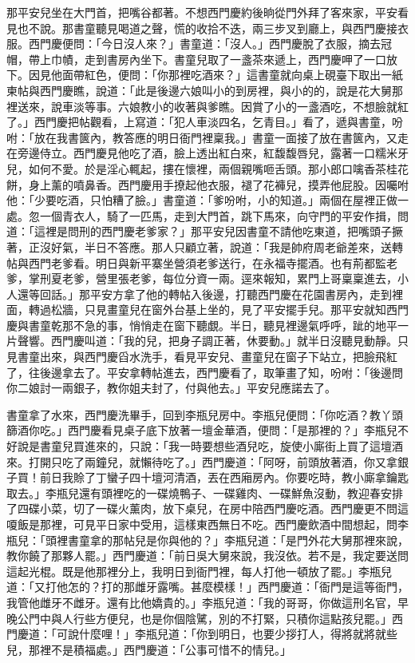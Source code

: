 那平安兒坐在大門首，把嘴谷都著。不想西門慶約後晌從門外拜了客來家，平安看見也不說。那書童聽見喝道之聲，慌的收拾不迭，兩三步叉到廳上，與西門慶接衣服。西門慶便問：「今日沒人來？」書童道：「沒人。」西門慶脫了衣服，摘去冠帽，帶上巾幘，走到書房內坐下。書童兒取了一盞茶來遞上，西門慶呷了一口放下。因見他面帶紅色，便問：「你那裡吃酒來？」這書童就向桌上硯臺下取出一紙柬帖與西門慶瞧，說道：「此是後邊六娘叫小的到房裡，與小的的，說是花大舅那裡送來，說車淡等事。六娘教小的收著與爹瞧。因賞了小的一盞酒吃，不想臉就紅了。」西門慶把帖觀看，上寫道：「犯人車淡四名，乞青目。」看了，遞與書童，吩咐：「放在我書篋內，教答應的明日衙門裡稟我。」書童一面接了放在書篋內，又走在旁邊侍立。西門慶見他吃了酒，臉上透出紅白來，紅馥馥唇兒，露著一口糯米牙兒，如何不愛。於是淫心輒起，摟在懷裡，兩個親嘴咂舌頭。那小郎口噙香茶桂花餅，身上薰的噴鼻香。西門慶用手撩起他衣服，褪了花褲兒，摸弄他屁股。因囑咐他：「少要吃酒，只怕糟了臉。」書童道：「爹吩咐，小的知道。」兩個在屋裡正做一處。忽一個青衣人，騎了一匹馬，走到大門首，跳下馬來，向守門的平安作揖，問道：「這裡是問刑的西門慶老爹家？」那平安兒因書童不請他吃東道，把嘴頭子撅著，正沒好氣，半日不答應。那人只顧立著，說道：「我是帥府周老爺差來，送轉帖與西門老爹看。明日與新平寨坐營須老爹送行，在永福寺擺酒。也有荊都監老爹，掌刑夏老爹，營里張老爹，每位分資一兩。逕來報知，累門上哥稟稟進去，小人還等回話。」那平安方拿了他的轉帖入後邊，打聽西門慶在花園書房內，走到裡面，轉過松牆，只見畫童兒在窗外台基上坐的，見了平安擺手兒。那平安就知西門慶與書童乾那不急的事，悄悄走在窗下聽覷。半日，聽見裡邊氣呼呼，跐的地平一片聲響。西門慶叫道：「我的兒，把身子調正著，休要動。」就半日沒聽見動靜。只見書童出來，與西門慶舀水洗手，看見平安兒、畫童兒在窗子下站立，把臉飛紅了，往後邊拿去了。平安拿轉帖進去，西門慶看了，取筆畫了知，吩咐：「後邊問你二娘討一兩銀子，教你姐夫封了，付與他去。」平安兒應諾去了。

書童拿了水來，西門慶洗畢手，回到李瓶兒房中。李瓶兒便問：「你吃酒？教丫頭篩酒你吃。」西門慶看見桌子底下放著一壇金華酒，便問：「是那裡的？」李瓶兒不好說是書童兒買進來的，只說：「我一時要想些酒兒吃，旋使小廝街上買了這壇酒來。打開只吃了兩鐘兒，就懶待吃了。」西門慶道：「阿呀，前頭放著酒，你又拿銀子買！前日我賒了丁蠻子四十壇河清酒，丟在西廂房內。你要吃時，教小廝拿鑰匙取去。」李瓶兒還有頭裡吃的一碟燒鴨子、一碟雞肉、一碟鮮魚沒動，教迎春安排了四碟小菜，切了一碟火薰肉，放下桌兒，在房中陪西門慶吃酒。西門慶更不問這嗄飯是那裡，可見平日家中受用，這樣東西無日不吃。西門慶飲酒中間想起，問李瓶兒：「頭裡書童拿的那帖兒是你與他的？」李瓶兒道：「是門外花大舅那裡來說，教你饒了那夥人罷。」西門慶道：「前日吳大舅來說，我沒依。若不是，我定要送問這起光棍。既是他那裡分上，我明日到衙門裡，每人打他一頓放了罷。」李瓶兒道：「又打他怎的？打的那雌牙露嘴。甚麼模樣！」西門慶道：「衙門是這等衙門，我管他雌牙不雌牙。還有比他嬌貴的。」李瓶兒道：「我的哥哥，你做這刑名官，早晚公門中與人行些方便兒，也是你個陰騭，別的不打緊，只積你這點孩兒罷。」西門慶道：「可說什麼哩！」李瓶兒道：「你到明日，也要少拶打人，得將就將就些兒，那裡不是積福處。」西門慶道：「公事可惜不的情兒。」

